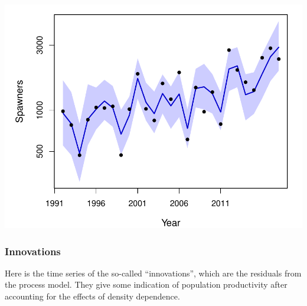 \documentclass[
  11pt,
]{article}
\begin{document}
\includegraphics{App_2_Summarize_results_Spring_Chinook_files/figure-latex/plot_escapement-1.pdf}

\hypertarget{innovations}{%
\subsubsection{Innovations}\label{innovations}}

Here is the time series of the so-called ``innovations'', which are the
residuals from the process model. They give some indication of
population productivity after accounting for the effects of density
dependence.
\end{document}
